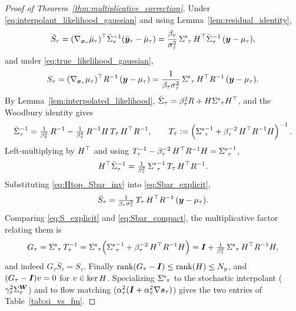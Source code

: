 \begin{proof}[Proof of Theorem~\ref{thm:multiplicative_correction}]
Under \eqref{eq:interpolant_likelihood_gaussian} and using Lemma~\ref{lem:residual_identity},
\begin{align}\label{eq:Sbar_explicit}
    \bar{S}_\tau
    = (\nabla_{\boldsymbol{x}_\tau} \bar{\mu}_\tau)^\top \bar{\Sigma}_\tau^{-1}
      (\bar{\boldsymbol{y}}_\tau - \bar{\mu}_\tau)
    = \frac{\beta_\tau}{\sigma_\tau^2}\,{\Sigma^{\mathrm{s}}}_\tau\,H^\top
      \bar{\Sigma}_\tau^{-1}\,(\boldsymbol{y} - \mu_\tau),
\end{align}
and under \eqref{eq:true_likelihood_gaussian},
\begin{align}\label{eq:S_explicit}
    S_\tau
    = (\nabla_{\boldsymbol{x}_\tau} \mu_\tau)^\top R^{-1}\,(\boldsymbol{y} - \mu_\tau)
    = \frac{1}{\beta_\tau \sigma_\tau^2}\,{\Sigma^{\mathrm{s}}}_\tau\,H^\top R^{-1}\,
      (\boldsymbol{y} - \mu_\tau).
\end{align}
By Lemma~\ref{lem:interpolated_likelihood}, $\bar{\Sigma}_\tau = \beta_\tau^2 R + H {\Sigma^{\mathrm{s}}}_\tau H^\top$, and the Woodbury identity gives
\begin{align}
    \bar{\Sigma}_\tau^{-1}
    = \tfrac{1}{\beta_\tau^2}\,R^{-1}
    - \tfrac{1}{\beta_\tau^4}\,R^{-1} H\, T_\tau\,
      H^\top R^{-1},
    \qquad
    T_\tau := \left({\Sigma^{\mathrm{s}}}_\tau^{-1}
    + \beta_\tau^{-2}\,H^\top R^{-1} H\right)^{-1}.
\end{align}
Left-multiplying by $H^\top$ and using $T_\tau^{-1} - \beta_\tau^{-2}\,H^\top R^{-1} H = {\Sigma^{\mathrm{s}}}_\tau^{-1}$,
\begin{align}\label{eq:Htop_Sbar_inv}
    H^\top \bar{\Sigma}_\tau^{-1}
    = \tfrac{1}{\beta_\tau^2}\,{\Sigma^{\mathrm{s}}}_\tau^{-1}\, T_\tau\,
      H^\top R^{-1}.
\end{align}
Substituting \eqref{eq:Htop_Sbar_inv} into \eqref{eq:Sbar_explicit},
\begin{align}\label{eq:Sbar_compact}
    \bar{S}_\tau
    = \tfrac{1}{\beta_\tau \sigma_\tau^2}\, T_\tau\,H^\top R^{-1}\,
      (\boldsymbol{y} - \mu_\tau).
\end{align}
Comparing \eqref{eq:S_explicit} and \eqref{eq:Sbar_compact}, the multiplicative factor relating them is
\begin{align}
    G_\tau
    = {\Sigma^{\mathrm{s}}}_\tau\, T_\tau^{-1}
    = {\Sigma^{\mathrm{s}}}_\tau\!\left({\Sigma^{\mathrm{s}}}_\tau^{-1}
      + \beta_\tau^{-2}\,H^\top R^{-1} H\right)
    = \bm{I} + \tfrac{1}{\beta_\tau^2}\,{\Sigma^{\mathrm{s}}}_\tau\,
      H^\top R^{-1} H,
\end{align}
and indeed $G_\tau \bar{S}_\tau = S_\tau$. Finally $\operatorname{rank}(G_\tau - \bm{I}) \leq \operatorname{rank}(H) \leq N_y$, and $(G_\tau - \bm{I}) v = 0$ for $v \in \ker H$. Specializing ${\Sigma^{\mathrm{s}}}_\tau$ to the stochastic interpolant ($\gamma_\tau^2\Sigma^{\boldsymbol{W}}_\tau$) and to flow matching ($\alpha_\tau^2(\bm{I}+\alpha_\tau^2\nabla\bm{s}_\tau)$) gives the two entries of Table~\ref{tab:si_vs_fm}.
\end{proof}
